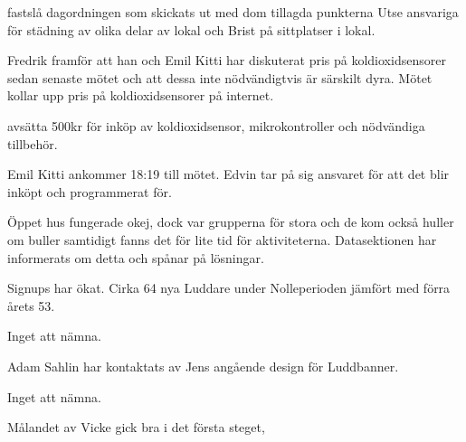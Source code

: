 \documentclass{protokoll}
\begin{document}
\newpage  


\begin{beslut}
     \att fastslå dagordningen som skickats ut med dom tillagda punkterna Utse ansvariga för städning av olika delar av lokal och Brist på sittplatser i lokal.
\end{beslut}

Fredrik framför att han och Emil Kitti har diskuterat pris på koldioxidsensorer sedan senaste mötet och att dessa inte nödvändigtvis är särskilt dyra. 
Mötet kollar upp pris på koldioxidsensorer på internet.
\begin{beslut}
    \att avsätta 500kr för inköp av koldioxidsensor, mikrokontroller och nödvändiga tillbehör.
\end{beslut}
Emil Kitti ankommer 18:19 till mötet.
Edvin tar på sig ansvaret för att det blir inköpt och programmerat för. 

Öppet hus fungerade okej, dock var grupperna för stora och de kom också huller om buller samtidigt fanns det för lite tid för aktiviteterna. Datasektionen har informerats om detta och spånar på lösningar. 

Signups har ökat. Cirka 64 nya Luddare under Nolleperioden jämfört med förra årets 53.

Inget att nämna.

Adam Sahlin har kontaktats av Jens angående design för Luddbanner.

Inget att nämna. 

Målandet av Vicke gick bra i det första steget, 
\end{document}

